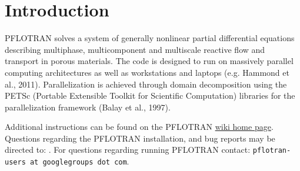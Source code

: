 
\section{Introduction}

PFLOTRAN solves a system of generally nonlinear partial differential equations describing multiphase, multicomponent and multiscale reactive flow and transport in porous materials. The code is designed to run on massively parallel computing architectures as well as workstations and laptops (e.g. Hammond et al., 2011). Parallelization is achieved through domain decomposition using the PETSc (Port\-a\-ble Extensible Toolkit for Scientific Computation) libraries for the parallelization framework (Balay et al., 1997).

Additional instructions can be found on the PFLOTRAN \href{https://bitbucket.org/pflotran/pflotran-dev/wiki/Home}{wiki home page}.
Questions regarding the PFLOTRAN installation, and bug reports may be directed to: .
For questions regarding running PFLOTRAN contact: {\footnotesize\tt pflotran-users at googlegroups dot com}.

